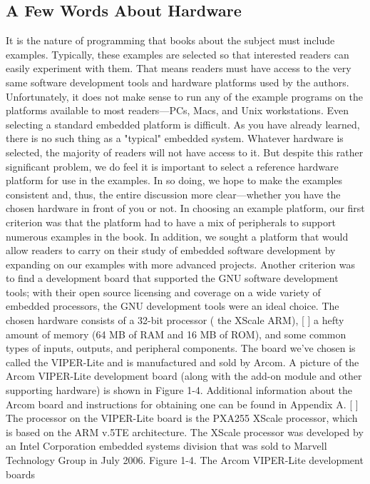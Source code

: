 \documentclass[output=paper, 
colorlinks,
citecolor=brown,
newtxmath
]{langscibook}
\begin{document}
\subsection {A Few Words About Hardware}

It is the nature of programming that books about the subject must include examples. Typically, these
examples are selected so that interested readers can easily experiment with them. That means readers
must have access to the very same software development tools and hardware platforms used by the
authors. Unfortunately, it does not make sense to run any of the example programs on the platforms
available to most readers—PCs, Macs, and Unix workstations.
Even selecting a standard embedded platform is difficult. As you have already learned, there is no such
thing as a "typical" embedded system. Whatever hardware is selected, the majority of readers will not
have access to it. But despite this rather significant problem, we do feel it is important to select a
reference hardware platform for use in the examples. In so doing, we hope to make the examples
consistent and, thus, the entire discussion more clear—whether you have the chosen hardware in front of
you or not.
In choosing an example platform, our first criterion was that the platform had to have a mix of
peripherals to support numerous examples in the book. In addition, we sought a platform that would
allow readers to carry on their study of embedded software development by expanding on our examples
with more advanced projects. Another criterion was to find a development board that supported the
GNU software development tools; with their open source licensing and coverage on a wide variety of
embedded processors, the GNU development tools were an ideal choice.
The chosen hardware consists of a 32-bit processor ( the XScale ARM), [ ] a hefty amount of memory
(64 MB of RAM and 16 MB of ROM), and some common types of inputs, outputs, and peripheral
components. The board we've chosen is called the VIPER-Lite and is manufactured and sold by Arcom.
A picture of the Arcom VIPER-Lite development board (along with the add-on module and other
supporting hardware) is shown in Figure 1-4. Additional information about the Arcom board and
instructions for obtaining one can be found in Appendix A.
[ ]
The processor on the VIPER-Lite board is the PXA255 XScale processor, which is based on the
ARM v.5TE architecture. The XScale processor was developed by an Intel Corporation embedded
systems division that was sold to Marvell Technology Group in July 2006.
Figure 1-4. The Arcom VIPER-Lite development boards
\end{document}
